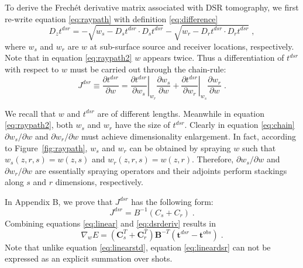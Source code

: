 To derive the Frech\'{e}t derivative matrix associated with DSR tomography, we first re-write equation 
\ref{eq:raypath} with definition \ref{eq:difference}
\begin{equation}
\label{eq:raypath2}
D_z t^{dsr} = 
- \sqrt{w_s - D_s t^{dsr} \cdot D_s t^{dsr}} 
- \sqrt{w_r - D_r t^{dsr} \cdot D_r t^{dsr}}\;,
\end{equation}
where $w_s$ and $w_r$ are $w$ at sub-surface source and receiver locations, 
respectively. Note that in equation \ref{eq:raypath2} 
$w$ appears twice. Thus a differentiation of 
$t^{dsr}$ with respect to $w$ must be carried 
out through the chain-rule:
\begin{equation}
\label{eq:chain}
J^{dsr} \equiv \frac{\partial t^{dsr}}{\partial w} = 
\left. \frac{\partial t^{dsr}}{\partial w_s} \right|_{w_r} 
\frac{\partial w_s}{\partial w} + 
\left. \frac{\partial t^{dsr}}{\partial w_r} \right|_{w_s} 
\frac{\partial w_r}{\partial w}\;.
\end{equation}

We recall that $w$ and $t^{dsr}$ are of different lengths. Meanwhile in equation \ref{eq:raypath2}, both $w_s$ 
and $w_r$ have the size of $t^{dsr}$. Clearly in equation \ref{eq:chain} $\partial w_s / \partial w$ and 
$\partial w_r / \partial w$ must achieve dimensionality enlargement. 
In fact, according to Figure~\ref{fig:raypath}, $w_s$ and $w_r$ can be obtained by spraying $w$ such that 
$w_s (z,r,s) = w (z,s)$ and $w_r (z,r,s) = w (z,r)$. Therefore, $\partial w_s / \partial w$ and 
$\partial w_r / \partial w$ are essentially spraying operators and their adjoints perform stackings along $s$ and 
$r$ dimensions, respectively.
\begin{comment}
\plot{relation}{width=0.95\textwidth}{A 2-D velocity model $w$ (left) 
is used in equation \ref{eq:raypath2} for both $w_s$ and $w_r$ (right). 
The plane with red solid lines is the model domain $(z,x)$ while the cube 
with gray dashed lines represents the prestack domain $(z,r,s)$.}
\plot{relation2}{width=0.95\textwidth}{Following 
Figure~\ref{fig:relation}, $w_s$ and $w_r$ are the results of spraying 
$w$ from $(z,x)$ to $(z,r,s)$.}
\end{comment}

In Appendix B, we prove that $J^{dsr}$ has the following form:
\begin{equation}
\label{eq:dsrderiv}
J^{dsr} = B^{-1} (C_s + C_r)\;.
\end{equation}
Combining equations \ref{eq:linear} and \ref{eq:dsrderiv} results in
\begin{equation}
\label{eq:lineardsr}
\nabla_w E = 
\left(\mathbf{C}_s^T + \mathbf{C}_r^T\right) \mathbf{B}^{-T} 
(\mathbf{t}^{dsr} - \mathbf{t}^{obs})\;.
\end{equation}
Note that unlike equation \ref{eq:linearstd}, equation \ref{eq:lineardsr} can not be expressed as an explicit 
summation over shots.

